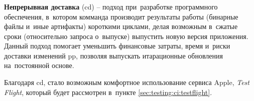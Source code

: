 \subsubsection{}
\label{sec:testing:ci:cd}

\textbf{Непрерывная доставка} (\gls{cd}) -- подход при~разработке программного обеспечения, в~котором комманда производит результаты работы (бинарные файлы и~иные артифакты) короткими циклами, делая возможным в~сжатые сроки (относительно запроса о~выпуске) выпустить новую версия приложения. Данный подход помогает уменьшить финансовые затраты, время и~риски доставки изменений \gls{pp}, позволяя выпускать итарационные обновления на~постоянной основе.

Благодаря \gls{cd}, стало возможным комфортное использование сервиса Apple, \textit{Test Flight}, который будет рассмотрен в~пункте \ref{sec:testing:ci:testflight}.